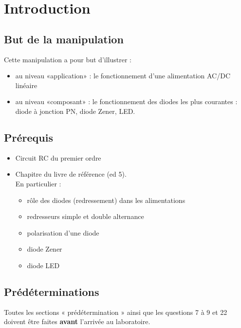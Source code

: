 \documentclass{../template/labo}
\author{The Fantastic Four}
\begin{document}

\section{Introduction}

\subsection{But de la manipulation}
Cette manipulation a pour but d'illustrer :
\begin{itemize}
\item au niveau «application» : le fonctionnement d'une alimentation AC/DC linéaire
\item au niveau «composant» : le fonctionnement des diodes les plus courantes : diode à jonction PN, diode Zener, LED.
\end{itemize}

\subsection{Prérequis}
\begin{itemize}
\item Circuit RC du premier ordre
\item Chapitre  du livre de référence (ed 5).\\ En particulier :
\begin{itemize}
\item rôle des diodes (redressement) dans les alimentations
\item redresseurs simple et double alternance
\item polarisation d'une diode
\item diode Zener
\item diode LED
\end{itemize}



\end{itemize}

\subsection{Prédéterminations}
Toutes les sections « prédétermination » ainsi que les questions 7 à 9 et 22 doivent être faites \textbf{avant} l'arrivée au laboratoire.
\end{document}
